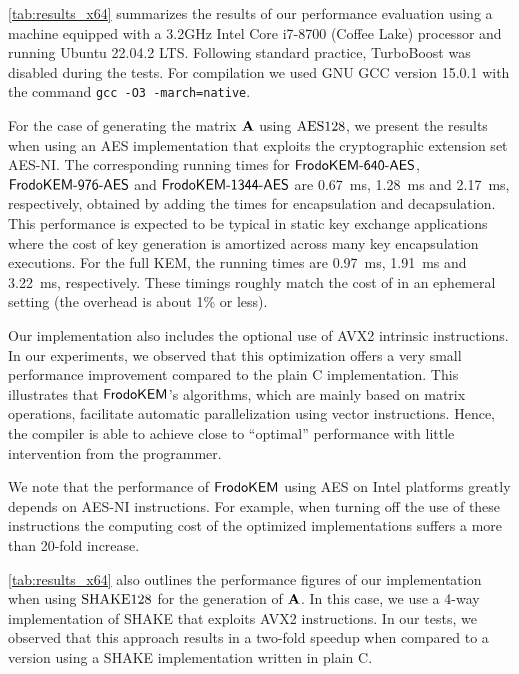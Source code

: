\autoref{tab:results_x64} summarizes the results of our performance evaluation using a machine equipped
with a 3.2GHz Intel Core i7-8700 (Coffee Lake) processor and running Ubuntu 22.04.2 LTS. Following standard practice,
TurboBoost was disabled during the tests. For compilation we used GNU GCC version 15.0.1 with the command
{\tt gcc -O3 -march=native}. 

For the case of generating the matrix $\mathbf{A}$ using $\textrm{\upshape\mdseries AES}128$, we present the results when using
an AES implementation that exploits the cryptographic extension set AES-NI.
The corresponding running times for $\textsf{\upshape\mdseries FrodoKEM-640-AES}$, $\textsf{\upshape\mdseries FrodoKEM-976-AES}$ and $\textsf{\upshape\mdseries FrodoKEM-1344-AES}$ are
0.67~ms, 1.28~ms and 2.17~ms, respectively, obtained by adding the times for encapsulation and decapsulation.
This performance is expected to be typical in static key exchange applications where the cost of key generation
is amortized across many key encapsulation executions. 
For the full KEM, the running times are 0.97~ms, 1.91~ms and 3.22~ms, respectively. 
These timings roughly match the cost of \eFrodoKEM in an ephemeral setting (the overhead is about 1\% or less).

Our implementation also includes the optional use of AVX2 intrinsic instructions. In our experiments, we observed that
this optimization offers a very small performance improvement compared to the plain C implementation. 
This illustrates that $\textsf{\upshape\mdseries FrodoKEM}$'s algorithms, which are mainly based on matrix operations, facilitate
automatic parallelization using vector instructions. Hence, the compiler is able to achieve close to ``optimal''
performance with little intervention from the programmer.

We note that the performance of $\textsf{\upshape\mdseries FrodoKEM}$ using AES on Intel platforms greatly depends on AES-NI instructions.
For example, when turning off the use of these instructions the computing cost of the optimized implementations
suffers a more than 20-fold increase.

\autoref{tab:results_x64} also outlines the performance figures of our implementation when using $\textrm{\upshape\mdseries SHAKE}128$
for the generation of $\mathbf{A}$. 
In this case, we use a 4-way implementation of SHAKE that exploits AVX2 instructions.
In our tests, we observed that this approach results in a two-fold speedup when compared to a version using a SHAKE implementation
written in plain C.  

